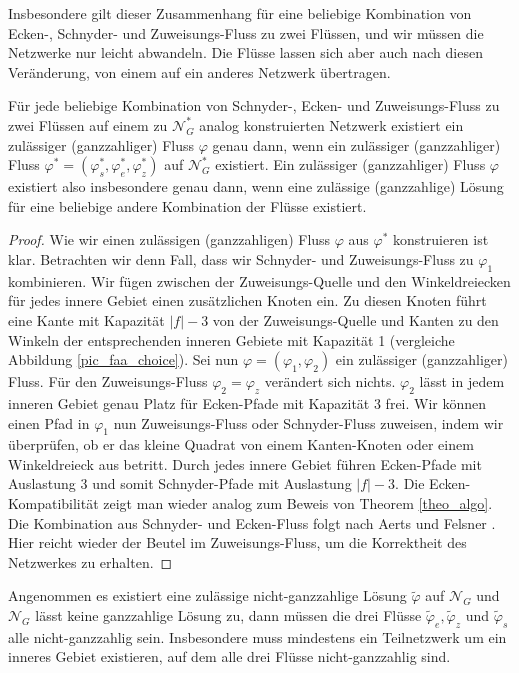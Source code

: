 Insbesondere gilt dieser Zusammenhang für eine beliebige Kombination von Ecken-, Schnyder- und Zuweisungs-Fluss zu zwei Flüssen, und wir müssen die Netzwerke nur leicht abwandeln. Die Flüsse lassen sich aber auch nach diesen Veränderung, von einem auf ein anderes Netzwerk übertragen.

\begin{proposition}\label{choose_types}
Für jede beliebige Kombination von Schnyder-, Ecken- und Zu\-weis\-ungs-Fluss zu zwei Flüssen auf einem zu $\mathcal{N}^*_G$ analog konstruierten Netzwerk existiert ein zulässiger (ganzzahliger) Fluss $\varphi$ genau dann, wenn ein zulässiger (ganzzahliger) Fluss $\varphi^*=(\varphi^*_s,\varphi^*_e,\varphi^*_z)$ auf $\mathcal{N}^*_G$ existiert. Ein zulässiger (ganzzahliger) Fluss $\varphi$ existiert also insbesondere genau dann, wenn eine zulässige (ganzzahlige) Lösung für eine beliebige andere Kombination der Flüsse existiert.
\end{proposition}

\begin{proof}
Wie wir einen zulässigen (ganzzahligen) Fluss $\varphi$ aus $\varphi^*$ konstruieren ist klar. Betrachten wir denn Fall, dass wir Schnyder- und Zu\-weis\-ungs-Fluss zu $\varphi_1$ kombinieren. Wir fügen zwischen der Zuweisungs-Quelle und den Winkeldreiecken für jedes innere Gebiet einen zusätzlichen Knoten ein. Zu diesen Knoten führt eine Kante mit Kapazität $|f|-3$ von der Zuweisungs-Quelle und Kanten zu den Winkeln der entsprechenden inneren Gebiete mit Kapazität 1 (vergleiche Abbildung \ref{pic_faa_choice}). Sei nun $\varphi=(\varphi_1,\varphi_2)$ ein zulässiger (ganzzahliger) Fluss. Für den Zuweisungs-Fluss $\varphi_2=\varphi_z$ verändert sich nichts. $\varphi_2$ lässt in jedem inneren Gebiet genau Platz für Ecken-Pfade mit Kapazität 3 frei. Wir können einen Pfad in $\varphi_1$ nun Zuweisungs-Fluss oder Schnyder-Fluss zuweisen, indem wir überprüfen, ob er das kleine Quadrat von einem Kanten-Knoten oder einem Winkeldreieck aus betritt. Durch jedes innere Gebiet führen Ecken-Pfade mit Auslastung 3 und somit Schnyder-Pfade mit Auslastung $|f|-3$. Die Ecken-Kompatibilität zeigt man wieder analog zum Beweis von Theorem \ref{theo_algo}. Die Kombination aus Schnyder- und Ecken-Fluss folgt nach Aerts und Felsner \cite{af15}. Hier reicht wieder der Beutel im Zuweisungs-Fluss, um die Korrektheit des Netzwerkes zu erhalten.
\end{proof}

\begin{proposition}\label{claim_non_int}
Angenommen es existiert eine zulässige nicht-ganzzahlige Lösung $\tilde{\varphi}$ auf $\mathcal{N}_G$ und $\mathcal{N}_G$ lässt keine ganzzahlige Lösung zu, dann müssen die drei Flüsse $\tilde{\varphi}_e, \tilde{\varphi}_z$ und $\tilde{\varphi}_s$ alle nicht-ganzzahlig sein. Insbesondere muss mindestens ein Teilnetzwerk um ein inneres Gebiet existieren, auf dem alle drei Flüsse nicht-ganzzahlig sind.
\end{proposition}


